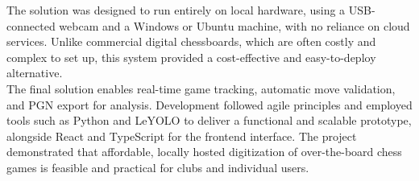 The solution was designed to run entirely on local hardware, using a USB-connected webcam and a Windows or Ubuntu machine, with no reliance on cloud services. Unlike commercial digital chessboards, which are often costly and complex to set up, this system provided a cost-effective and easy-to-deploy alternative. \\

The final solution enables real-time game tracking, automatic move validation, and PGN export for analysis. Development followed agile principles and employed tools such as Python and LeYOLO to deliver a functional and scalable prototype, alongside React and TypeScript for the frontend interface. The project demonstrated that affordable, locally hosted digitization of over-the-board chess games is feasible and practical for clubs and individual users.